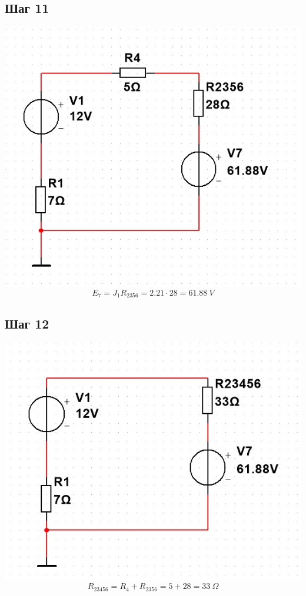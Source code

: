 \documentclass[14pt, a4paper]{article}
\begin{document}
    \subsection*{Шаг 11}
    \includegraphics[width=1\textwidth]{Stage11.jpg}
    $$E_7 = J_1 R_{2356} = 2.21 \cdot 28 = 61.88 \ V$$

    \subsection*{Шаг 12}
    \includegraphics[width=1\textwidth]{Stage12.jpg}
    $$R_{23456} = R_4 + R_{2356} = 5 + 28 = 33 \ \Omega$$
\end{document}
